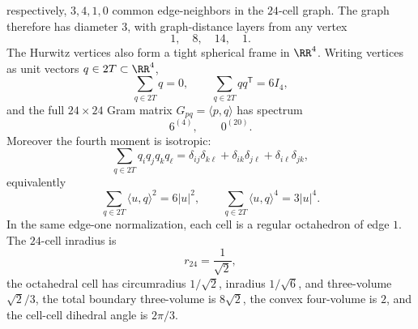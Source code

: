 \documentclass[11pt]{article}
\begin{document}
\begin{theorem}[\(m=1\) finite numerical data]
respectively, \(3,4,1,0\) common edge-neighbors in the \(24\)-cell graph.
The graph therefore has diameter \(3\), with graph-distance layers from any
vertex
\[
    1,
    \quad 8,
    \quad 14,
    \quad 1.
\]
The Hurwitz vertices also form a tight spherical frame in \(\RR^4\).  Writing
vertices as unit vectors \(q\in 2T\subset\RR^4\),
\[
    \sum_{q\in2T}q=0,
    \qquad
    \sum_{q\in2T} qq^{\mathsf T}=6I_4,
\]
and the full \(24\times24\) Gram matrix \(G_{pq}=\langle p,q\rangle\) has
spectrum
\[
    6^{(4)},\qquad 0^{(20)}.
\]
Moreover the fourth moment is isotropic:
\[
    \sum_{q\in2T} q_iq_jq_kq_\ell
    =\delta_{ij}\delta_{k\ell}
     +\delta_{ik}\delta_{j\ell}
     +\delta_{i\ell}\delta_{jk},
\]
equivalently
\[
    \sum_{q\in2T}\langle u,q\rangle^2=6|u|^2,
    \qquad
    \sum_{q\in2T}\langle u,q\rangle^4=3|u|^4.
\]
In the same edge-one normalization, each cell is a regular octahedron of edge
\(1\).  The \(24\)-cell inradius is
\[
    r_{24}=\frac1{\sqrt2},
\]
the octahedral cell has circumradius \(1/\sqrt2\), inradius \(1/\sqrt6\), and
three-volume \(\sqrt2/3\), the total boundary three-volume is \(8\sqrt2\),
the convex four-volume is \(2\), and the cell-cell dihedral angle is
\(2\pi/3\).


\end{theorem}
\end{document}
